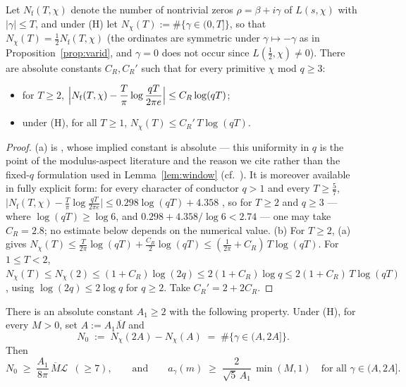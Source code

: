\begin{lemma}\label{lem:rvm-joint}
Let $N_{\mathrm f}(T,\chi)$ denote the number of nontrivial zeros
$\rho=\beta+i\gamma$ of $L(s,\chi)$ with $|\gamma|\le T$, and under (H)
let $N_\chi(T):=\#\{\gamma\in(0,T]\}$, so that
$N_\chi(T)=\tfrac12N_{\mathrm f}(T,\chi)$ (the ordinates are symmetric
under $\gamma\mapsto-\gamma$ as in Proposition~\ref{prop:varid}, and
$\gamma=0$ does not occur since $L(\tfrac12,\chi)\ne0$). There are
absolute constants $C_R,C_R'$ such that for every primitive $\chi$ mod
$q\ge3$:
\begin{itemize}
\item[(a)] for $T\ge2$,
$\displaystyle
\Bigl|N_{\mathrm f}(T,\chi)-\frac{T}{\pi}\log\frac{qT}{2\pi e}
\Bigr|\le C_R\log(qT)$;
\item[(b)] under (H), for all $T\ge1$,
$N_\chi(T)\le C_R'\,T\log(qT)$.
\end{itemize}
\end{lemma}

\begin{proof}
(a) is \cite[Theorem~14.5]{MV07}, whose implied constant is absolute
--- this uniformity in $q$ is the point of the modulus-aspect
literature and the reason we cite \cite{MV07} rather than the
fixed-$q$ formulation used in Lemma~\ref{lem:window}
(cf.\ \cite[\S16]{Dav00}). It is moreover available in fully
explicit form: for every character of conductor $q>1$ and every
$T\ge\tfrac57$,
$\bigl|N_{\mathrm f}(T,\chi)-\tfrac T\pi\log\tfrac{qT}{2\pi e}\bigr|
\le0.298\log(qT)+4.358$ \cite[Corollary~1.2]{BMOR21}, so for
$T\ge2$ and $q\ge3$ --- where $\log(qT)\ge\log6$, and
$0.298+4.358/\log6<2.74$ --- one may take $C_R=2.8$; no estimate
below depends on the numerical value. (b) For $T\ge2$, (a) gives
$N_\chi(T)\le\tfrac{T}{2\pi}\log(qT)+\tfrac{C_R}2\log(qT)
\le(\tfrac1{2\pi}+C_R)\,T\log(qT)$. For $1\le T<2$,
$N_\chi(T)\le N_\chi(2)\le(1+C_R)\log(2q)\le2(1+C_R)\log q
\le2(1+C_R)\,T\log(qT)$, using $\log(2q)\le2\log q$ for $q\ge2$. Take
$C_R'=2+2C_R$.
\end{proof}

\begin{lemma}\label{lem:window-joint}
There is an absolute constant $A_1\ge2$ with the following property.
Under (H), for every $M>0$, set $A:=A_1\overline M$ and
\[
N_0\;:=\;N_\chi(2A)-N_\chi(A)
\;=\;\#\{\gamma\in(A,2A]\}.
\]
Then
\begin{equation}\label{eq:windowq}
N_0\;\ge\;\frac{A_1}{8\pi}\,\overline M\mathcal L\;\ (\ge7),
\qquad\text{and}\qquad
a_\gamma(m)\;\ge\;\frac{2}{\sqrt5\,A_1}\,\min(M,1)
\quad\text{for all }\gamma\in(A,2A].
\end{equation}
\end{lemma}

